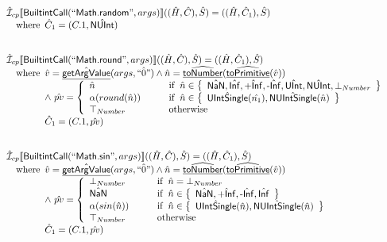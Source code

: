 \documentclass{article}
\newcommand{\SF}[1]{\mbox{\textsf{#1}}}
\newcommand{\wherec}[1]{{\rm where}\begin{array}[t]{l}#1\end{array}}
\newcommand{\ifc}[1]{{\rm if}\begin{array}[t]{l}#1\end{array}}
\newcommand{\owc}{{\rm otherwise}}
\newcommand{\aI}{\hat{\mathcal{I}}}
\newcommand{\set}[1]{\left\{\begin{array}{l}#1\end{array}\right\}}
\newcommand{\lbr}{\llbracket}
\newcommand{\rbr}{\rrbracket}
\newcommand{\hf}[1]{\underline{\sf #1}}
\newcommand{\ahf}[1]{\widehat{\underline{\sf #1}}}
\begin{document}
\[
\begin{array}{l}
\aI _{cp}\lbr \SF{BuiltintCall}(``\SF{Math.random}",args)\rbr((\hat{H},\hat{C}), \hat{S})
  = ((\hat{H}, \hat{C}_1), \hat{S})\\
\quad\wherec{
  \hat{C}_1 = (C.1, \hat{\SF{NUInt}})
  }\\
\\\\



\aI _{cp}\lbr \SF{BuiltintCall}(``\SF{Math.round}",args)\rbr((\hat{H},\hat{C}), \hat{S})
  = ((\hat{H}, \hat{C}_1), \hat{S})\\
\quad\wherec{
  \hat{v}=\hat{\hf{getArgValue}}(args, \hat{``0"}) \land \hat{n}=\ahf{toNumber}(\ahf{toPrimitive}(\hat{v}))\\
  \land\ \hat{pv}   = 
  \left\{
    \begin{array}{l@{\quad\quad\quad}l}
      \hat{n} & \ifc{\hat{n} \in \set{\hat{\SF{NaN}}, \hat{\SF{Inf}}, \hat{\SF{+Inf}}, \hat{\SF{-Inf}}, \hat{\SF{UInt}}, \hat{\SF{NUInt}}, \bot_{Number}}}\\
      \alpha(round(\hat{n})) & \ifc{\hat{n} \in \set{\hat{\SF{UIntSingle}}(\hat{n_1}), \hat{\SF{NUIntSingle}}(\hat{n})}}\\
      \top_{Number} & \owc\\
    \end{array}
  \right.\\
  \hat{C}_1 = (C.1, \hat{pv})
  }\\
\\\\



\aI _{cp}\lbr \SF{BuiltintCall}(``\SF{Math.sin}",args)\rbr((\hat{H},\hat{C}), \hat{S})
  = ((\hat{H}, \hat{C}_1), \hat{S})\\
\quad\wherec{
  \hat{v}=\hat{\hf{getArgValue}}(args, \hat{``0"}) \land \hat{n}=\ahf{toNumber}(\ahf{toPrimitive}(\hat{v}))\\
  \land\ \hat{pv}   = 
  \left\{
    \begin{array}{l@{\quad\quad\quad}l}
      \bot_{Number} & \ifc{\hat{n} = \bot_{Number}}\\
      \hat{\SF{NaN}} & \ifc{\hat{n} \in \set{\hat{\SF{NaN}}, \hat{\SF{+Inf}}, \hat{\SF{-Inf}}, \hat{\SF{Inf}}}}\\
      \alpha(sin(\hat{n})) & \ifc{\hat{n} \in \set{\hat{\SF{UIntSingle}}(\hat{n}), \hat{\SF{NUIntSingle}}(\hat{n})}}\\
      \top_{Number} & \owc\\
    \end{array}
  \right.\\
  \hat{C}_1 = (C.1, \hat{pv})
  }\\
\\\\




\end{array}\]
\end{document}

